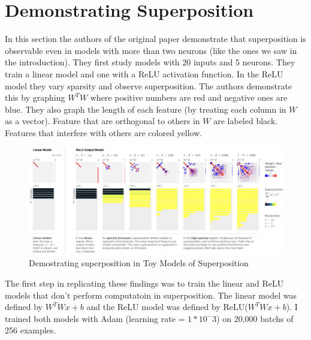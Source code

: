 \documentclass{article} %
\begin{document}
\section{Demonstrating Superposition}

In this section the authors of the original paper demonstrate that superposition
is observable even in models with more than two neurons (like the ones we saw in
the introduction). They first study models with 20 inputs and 5 neurons. They
train a linear model and one with a ReLU activation function. In the ReLU model
they vary sparsity and observe superposition.\newline\newline
The authors demonstrate this by graphing $W^TW$ where positive numbers are red
and negative ones are blue. They also graph the length of each feature (by treating
each column in $W$ as a vector). Feature that are orthogonal to others in $W$ are
labeled black. Features that interfere with others are colored yellow.

\begin{figure}[h]
    \centering
    \includegraphics[width=0.9\linewidth]{demonstrating_superposition/images/anthropic_section3.png}
    \captionsetup{font=footnotesize} %
    \caption{Demostrating superposition in Toy Models of Superposition \cite{elhage2022toy}}
    \label{fig:section3_anthropic}
\end{figure}

The first step in replicating these findings was to train the linear and ReLU
models that don't perform computatoin in superposition. The linear model was
defined by $W^TWx + b$ and the ReLU model was defined by ReLU($W^TWx + b$). I trained both models
with Adam (learning rate = $1*10^-3$) on 20,000 batchs of 256 examples.
\end{document}
